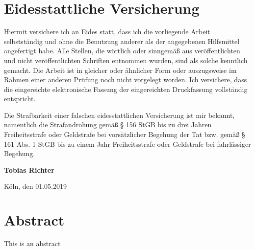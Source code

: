 \documentclass[a4paper, 12pt]{article}
\begin{document}
\section*{Eidesstattliche Versicherung}
\label{sec:SOOA}

\vspace{2.5cm}


Hiermit versichere ich an Eides statt, dass ich die vorliegende Arbeit selbstständig und ohne die Benutzung anderer als der angegebenen Hilfsmittel angefertigt habe. Alle Stellen, die wörtlich oder sinngemäß aus veröffentlichten und nicht veröffentlichten Schriften entnommen wurden, sind als solche kenntlich gemacht. Die Arbeit ist in gleicher oder ähnlicher Form oder auszugsweise im Rahmen einer anderen Prüfung noch nicht vorgelegt worden. Ich versichere, dass die eingereichte elektronische Fassung der eingereichten Druckfassung vollständig entspricht.

\vspace{1cm}

\noindent
Die Strafbarkeit einer falschen eidesstattlichen Versicherung ist mir bekannt, namentlich die Strafandrohung gemäß § 156 StGB bis zu drei Jahren Freiheitsstrafe oder Geldstrafe bei vorsätzlicher Begehung der Tat bzw. gemäß § 161 Abs. 1 StGB bis zu einem Jahr Freiheitsstrafe oder Geldstrafe bei fahrlässiger Begehung.

\vspace{3cm}
\noindent
\textbf{Tobias Richter}

\vspace{0.5cm}
\noindent
Köln, den 01.05.2019
\clearpage
\thispagestyle{empty}

\section*{Abstract}
This is an abstract
\end{document}
